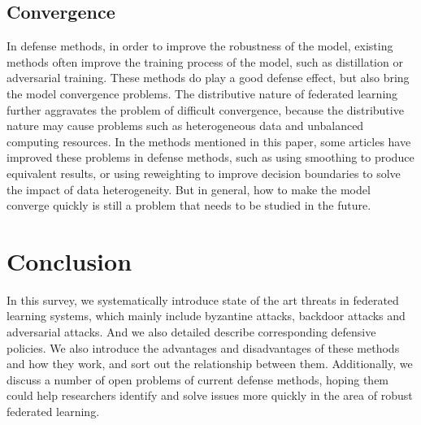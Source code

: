 \subsection{Convergence}
In defense methods, in order to improve the robustness
of the model, existing methods often improve the training
process of the model, such as distillation or adversarial
training. These methods do play a good defense effect, but
also bring the model convergence problems. The distributive
nature of federated learning further aggravates the
problem of diﬀicult convergence, because the distributive
nature may cause problems such as heterogeneous data
and unbalanced computing resources. In the methods
mentioned in this paper, some articles have improved these
problems in defense methods, such as using smoothing
to produce equivalent results, or using reweighting to
improve decision boundaries to solve the impact of data
heterogeneity. But in general, how to make the model
converge quickly is still a problem that needs to be studied
in the future.
\section{Conclusion}
In this survey, we systematically introduce state of the art 
threats in federated learning systems, which mainly
include byzantine attacks, backdoor attacks and adversarial
attacks. And we also detailed describe corresponding
defensive policies. We also introduce the advantages and
disadvantages of these methods and how they work, and
sort out the relationship between them. Additionally, we
discuss a number of open problems of current defense
methods, hoping them could help researchers identify and
solve issues more quickly in the area of robust federated
learning.
